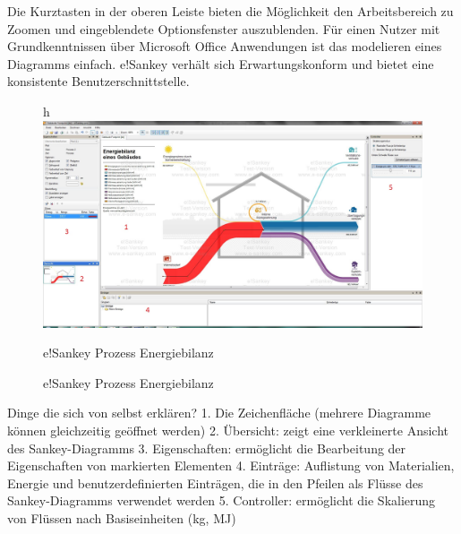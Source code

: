 \documentclass[a4paper, 12pt, twoside, BCOR=20mm, DIV=calc, abstracton, parskip=half*, toc=bibliography, toc=listof, headsepline, footsepline, headings=small, numbers=enddot]{scrreprt}
\begin{document}
Die Kurztasten in der oberen Leiste bieten die Möglichkeit den Arbeitsbereich zu Zoomen und eingeblendete Optionsfenster auszublenden. Für einen Nutzer mit Grundkenntnissen über Microsoft Office Anwendungen ist das modelieren eines Diagramms einfach. e!Sankey verhält sich Erwartungskonform und bietet eine konsistente Benutzerschnittstelle. 
\begin{figure}{h}
\centering
\includegraphics[width=\textwidth]{Bild/esankey Prozess Haus.JPG}
\caption{e!Sankey Prozess Energiebilanz}{e!Sankey Prozess Energiebilanz}
\end{figure}	
Dinge die sich von selbst erklären?
	1. Die Zeichenfläche (mehrere Diagramme können gleichzeitig geöffnet werden) 
	2. Übersicht: zeigt eine verkleinerte Ansicht des Sankey-Diagramms 
	3. Eigenschaften: ermöglicht die Bearbeitung der Eigenschaften von markierten
	Elementen 
	4. Einträge: Auflistung von Materialien, Energie und benutzerdefinierten Einträgen,
	die in den Pfeilen als Flüsse des Sankey-Diagramms verwendet werden 
	5. Controller: ermöglicht die Skalierung von Flüssen nach Basiseinheiten (kg, MJ) 
\end{document}
